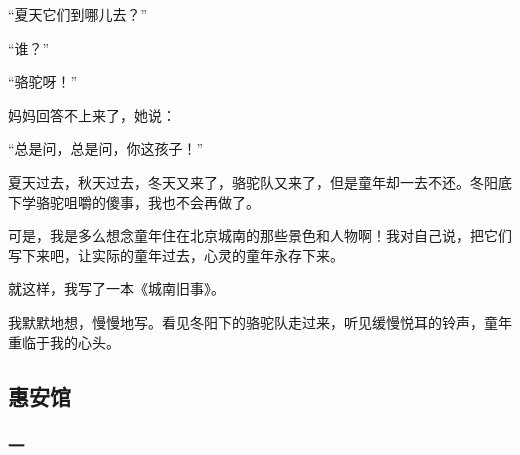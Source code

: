 \par “夏天它们到哪儿去？”
\par “谁？”
\par “骆驼呀！”
\par 妈妈回答不上来了，她说：
\par “总是问，总是问，你这孩子！”
\par 夏天过去，秋天过去，冬天又来了，骆驼队又来了，但是童年却一去不还。冬阳底下学骆驼咀嚼的傻事，我也不会再做了。
\par 可是，我是多么想念童年住在北京城南的那些景色和人物啊！我对自己说，把它们写下来吧，让实际的童年过去，心灵的童年永存下来。
\par 就这样，我写了一本《城南旧事》。
\par 我默默地想，慢慢地写。看见冬阳下的骆驼队走过来，听见缓慢悦耳的铃声，童年重临于我的心头。
\par {}



\subsection{惠安馆}







\subsubsection*{一}

